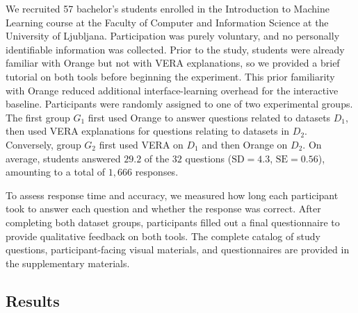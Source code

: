 \documentclass[lettersize,journal]{IEEEtran}
\makeatletter
\providecommand{\DIFadd}[1]{{\protect\color{blue}\uwave{#1}}} %
\providecommand{\DIFdel}[1]{{\protect\color{red}\sout{#1}}} %
\providecommand{\DIFaddbegin}{} %
\providecommand{\DIFaddend}{} %
\providecommand{\DIFdelbegin}{} %
\providecommand{\DIFdelend}{} %
\providecommand{\DIFscaledelfig}{0.5}
\newlength{\DIFdelgraphicswidth} %
\newlength{\DIFdelgraphicsheight} %
\providecommand{\DIFaddincludegraphics}[2][]{{\color{blue}\fbox{\DIFOincludegraphics[#1]{#2}}}} %
\providecommand{\DIFdelincludegraphics}[2][]{%
\sbox{\DIFdelgraphicsbox}{\DIFOincludegraphics[#1]{#2}}%
\settoboxwidth{\DIFdelgraphicswidth}{\DIFdelgraphicsbox} %
\settoboxtotalheight{\DIFdelgraphicsheight}{\DIFdelgraphicsbox} %
\scalebox{\DIFscaledelfig}{%
\parbox[b]{\DIFdelgraphicswidth}{\usebox{\DIFdelgraphicsbox}\\[-\baselineskip] \rule{\DIFdelgraphicswidth}{0em}}\llap{\resizebox{\DIFdelgraphicswidth}{\DIFdelgraphicsheight}{%
\setlength{\unitlength}{\DIFdelgraphicswidth}%
\begin{picture}(1,1)%
\thicklines\linethickness{2pt} %
{\color[rgb]{1,0,0}\put(0,0){\framebox(1,1){}}}%
{\color[rgb]{1,0,0}\put(0,0){\line( 1,1){1}}}%
{\color[rgb]{1,0,0}\put(0,1){\line(1,-1){1}}}%
\end{picture}%
}\hspace*{3pt}}} %
} %
\DeclareRobustCommand{\DIFaddbegin}{\DIFOaddbegin \let\includegraphics\DIFaddincludegraphics} %
\DeclareRobustCommand{\DIFaddend}{\DIFOaddend \let\includegraphics\DIFOincludegraphics} %
\DeclareRobustCommand{\DIFdelbegin}{\DIFOdelbegin \let\includegraphics\DIFdelincludegraphics} %
\DeclareRobustCommand{\DIFdelend}{\DIFOaddend \let\includegraphics\DIFOincludegraphics} %
\let\sout@orig\sout %
\renewcommand{\sout}[1]{\ifmmode\text{\sout@orig{\ensuremath{#1}}}\else\sout@orig{#1}\fi} %
\makeatother
\begin{document}
We recruited 57 bachelor's students enrolled in the Introduction to Machine Learning course at the Faculty of Computer and Information Science at the University of Ljubljana.
Participation was purely voluntary, and no personally identifiable information was collected.
Prior to the study, students were already familiar with Orange but not with VERA explanations, so we provided a brief tutorial on both tools before beginning the experiment. This prior familiarity with Orange reduced additional interface-learning overhead for the interactive baseline.
Participants were randomly assigned to one of two experimental groups. The first group $G_1$ first used Orange to answer questions related to datasets $D_1$, then used VERA explanations for questions relating to datasets in $D_2$. Conversely, group $G_2$ first used VERA on $D_1$ and then Orange on $D_2$. On average, students answered $29.2$ of the $32$ questions ($\text{SD}= 4.3$, $\text{SE}=0.56$), amounting to a total of \DIFdelbegin \DIFdel{$1,666$ }\DIFdelend \DIFaddbegin \DIFadd{1,666 }\DIFaddend responses.

To assess response time and accuracy, we measured how long each participant took to answer each question and whether the response was correct. After completing both dataset groups, participants filled out a final questionnaire to provide qualitative feedback on both tools. The complete catalog of study questions, participant-facing visual materials, and questionnaires are provided in the supplementary materials.

\subsection{Results}
\label{sec:user-study:results}
\end{document}
